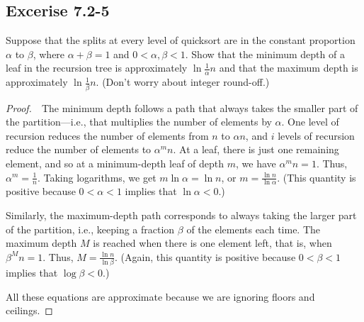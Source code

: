 \documentclass{article}
\begin{document}
\subsection*{Excerise 7.2-5}
Suppose that the splits at every level of quicksort are in the constant proportion $\alpha$ to $\beta$, where $\alpha + \beta = 1$ and $0 < \alpha, \beta < 1$. 
Show that the minimum depth of a leaf in the recursion tree is approximately $\ln \frac{1}{\alpha} n$ and that the maximum depth is approximately $\ln \frac{1}{\beta} n$. (Don't worry about integer round-off.)
\begin{proof}
    $ $\newline
    $ $\newline
    The minimum depth follows a path that always takes the smaller part of the partition—i.e., 
    that multiplies the number of elements by $\alpha$. 
    One level of recursion reduces the number of elements from $n$ to $\alpha n$, 
    and $i$ levels of recursion reduce the number of elements to $\alpha^m n$. 
    At a leaf, there is just one remaining element, 
    and so at a minimum-depth leaf of depth $m$, we have $\alpha^m n = 1$. 
    Thus, $\alpha^m = \frac{1}{n}$. 
    Taking logarithms, we get $m \ln \alpha = \ln n$, or $m = \frac{\ln n}{\ln \alpha}$. 
    (This quantity is positive because $0 < \alpha < 1$ implies that $\ln \alpha < 0$.)
    
    Similarly, the maximum-depth path corresponds to always taking the larger part of the partition, 
    i.e., keeping a fraction $\beta$ of the elements each time. 
    The maximum depth $M$ is reached when there is one element left, 
    that is, when $\beta^M n = 1$. 
    Thus, $M = \frac{\ln n}{\ln \beta}$. 
    (Again, this quantity is positive because $0 < \beta < 1$ implies that $\log \beta < 0$.)
    
    All these equations are approximate because we are ignoring floors and ceilings.
\end{proof}
\end{document}
